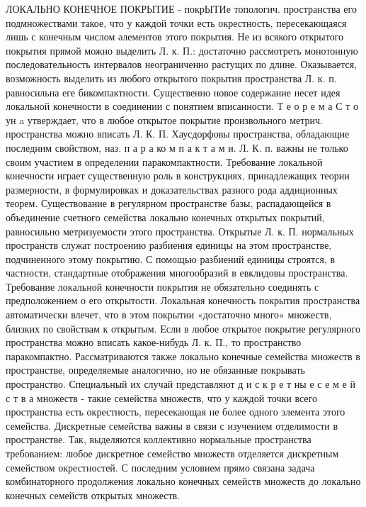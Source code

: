 \documentclass[10pt]{article}
\begin{document}
ЛОКАЛЬНО КОНЕЧНОЕ ПОКРЫТИЕ - покрЫТИе топологич. пространства его подмножествами такое, что у каждой точки есть окрестность, пересекающаяся лишь с конечным числом әлементов этого покрытия. Не из всякого открытого покрытия прямой можно выделить Л. к. П.: достаточно рассмотреть монотонную последовательность интервалов неограниченно растущих по длине. Оказывается, возможность выделить из любого открытого покрытия пространства Л. к. п. равносильна еге бикомпактности. Существенно новое содержание несет идея локальной конечности в соединении с понятием вписанности. Т е о р е м а С т о ун a утверждает, что в любое открытое покрытие произвольного метрич. пространства можно вписать Л. К. П. Хаусдорфовы пространства, обладающие последним свойством, наз. п а р а ко м п а к т а м и. Л. К. п. важны не только своим участием в определении паракомпактности. Требование локальной конечности играет существенную роль в конструкциях, принадлежащих теории размерности, в формулировках и доказательствах разного рода аддиционных теорем. Существование в регулярном пространстве базы, распадающейся в объединение счетноғо семейства локально конечных открытых покрытий, равносильно метризуемости этого пространства. Открытые Л. к. П. нормальных пространств служат построению разбиения единицы на этом пространстве, подчиненного этому покрытию. С помощью разбиений единицы строятся, в частности, стандартные отображения многообразий в евклидовы пространства. Требование локальной конечности покрытия не обязательно соединять с предположением о его открытости. Локальная конечность покрытия пространства автоматически влечет, что в этом покрытии «достаточно много» множеств, близких по свойствам к открытым. Если в любое открытое покрытие регулярного пространства можно вписать какое-нибудь Л. к. П., то пространство паракомпактно. Рассматриваются также локально конечные семейства множеств в пространстве, определяемые аналогично, но не обязанные покрывать пространство. Специальный их случай представляют д и с к р е т ны е с е м е й с т в а множеств - такие семейства множеств, что у каждой точки всего пространства есть окрестность, пересекающая не более одного элемента этого семейства. Дискретные семейства важны в связи с изучением отделимости в пространстве. Так, выделяются коллективно нормальные пространства требованием: любое дискретное семейство множеств отделяется дискретным семейством окрестностей. С последним условием прямо связана задача комбинаторного продолжения локально конечных семейств множеств до локально конечных семейств открытых множеств.
\end{document}
